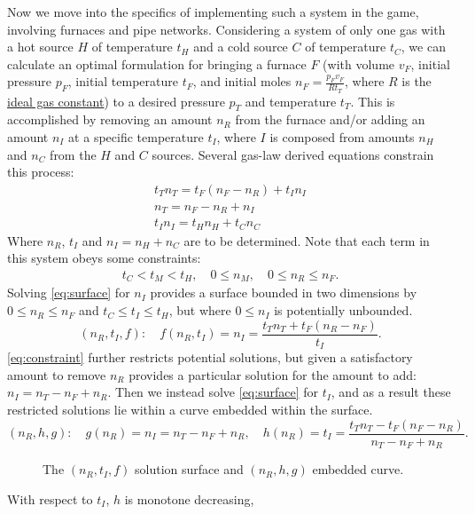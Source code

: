 \documentclass{article}
\begin{document}
Now we move into the specifics of implementing such a system in the game,
involving furnaces and pipe networks.
Considering a system of only one gas with
a hot source $H$ of temperature $t_H$ and
a cold source $C$ of temperature $t_C$,
we can calculate an optimal formulation for bringing a furnace $F$
(with volume $v_F$, initial pressure $p_F$, initial temperature $t_F$,
and initial moles $n_F=\frac{p_F v_F}{R t_T}$, where
$R$ is the \href{https://en.wikipedia.org/wiki/Gas_constant}{ideal gas constant})
to a desired pressure $p_T$ and temperature $t_T$.
This is accomplished by removing an amount $n_R$ from the furnace and/or adding
an amount $n_I$ at a specific temperature $t_I$, where $I$ is composed from
amounts $n_H$ and $n_C$ from the $H$ and $C$ sources.
Several gas-law derived equations constrain this process:
\begin{gather}
    t_T n_T = t_F(n_F-n_R)+t_I n_I \label{eq:surface} \\
    n_T = n_F-n_R+n_I \label{eq:constraint} \\
    t_I n_I = t_H n_H+t_C n_C \label{eq:added}
\end{gather}
Where $n_R$, $t_I$ and $n_I=n_H+n_C$ are to be determined.
Note that each term in this system obeys some constraints:
\begin{gather*}
    t_C<t_M<t_H,\quad
    0\le n_M,\quad
    0\le n_R\le n_F.
\end{gather*}
Solving \autoref{eq:surface} for $n_I$ provides
a surface bounded in two dimensions
by $0\le n_R\le n_F$ and $t_C\le t_I\le t_H$,
but where $0\le n_I$ is potentially unbounded.
\[
    (n_R,t_I,f):\quad
    f(n_R,t_I) = n_I = \frac{t_T n_T+t_F(n_R-n_F)}{t_I}.
\]
\autoref{eq:constraint} further restricts potential solutions, but
given a satisfactory amount to remove $n_R$ provides a particular solution
for the amount to add: $n_I=n_T-n_F+n_R$.
Then we instead solve \autoref{eq:surface} for $t_I$,
and as a result these restricted solutions lie
within a curve embedded within the surface.
\[
    (n_R,h,g):\quad
    g(n_R) = n_I = n_T-n_F+n_R,\quad
    h(n_R) = t_I = \frac{t_T n_T-t_F(n_F-n_R)}{n_T-n_F+n_R}.
\]
\begin{figure}
    \begin{center}
    \end{center}
    \caption[]{%
        The $(n_R,t_I,f)$ solution surface
        and $(n_R,h,g)$ embedded curve.
    }
    \label{fig:surface}
\end{figure}
\noindent
With respect to $t_I$, $h$ is monotone decreasing,
\end{document}
